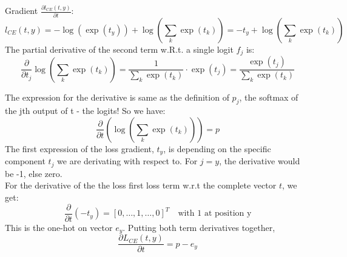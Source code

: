 \begin{answer}

        Gradient $\frac{\partial l_{CE}(t, y)}{\partial t}$: \\

        \[ l_{CE}(t, y) = -\log(\exp(t_y)) + \log(\sum_k \exp(t_k)) = -t_{y} + \log(\sum_k \exp(t_k)) \]
        The partial derivative of the second term w.R.t. a single logit $f_j$ is:
        \[ \frac{\partial}{\partial t_j} \log(\sum_k \exp(t_k)) =  \frac{1}{\sum_k \exp(t_k)} \cdot \exp(t_j) = \frac{\exp(t_j)}{\sum_k \exp(t_k)} \]
        
        The expression for the derivative is same as the definition of $p_j$, the softmax of the jth output of t - the logits! So we have:
        \[ \frac{\partial}{\partial t} (\log(\sum_k \exp(t_k))) = p \]
        The first expression of the loss gradient, $t_y$, is depending on the specific component $t_j$ we are derivating with respect to. For $j=y$, the derivative would be -1, else zero. \\

        For the derivative of the the loss first loss term w.r.t the complete vector $t$, we get:
\[ \frac{\partial}{\partial t} (-t_y) = [0, \dots, 1, \dots, 0]^T \quad \text{with 1 at position y} \]
This is the one-hot on vector \(e_y\). Putting both term derivatives together,
\[ \frac{\partial L_{CE}(t,y)}{\partial t} = p - e_y \]
\end{answer}
   
  

